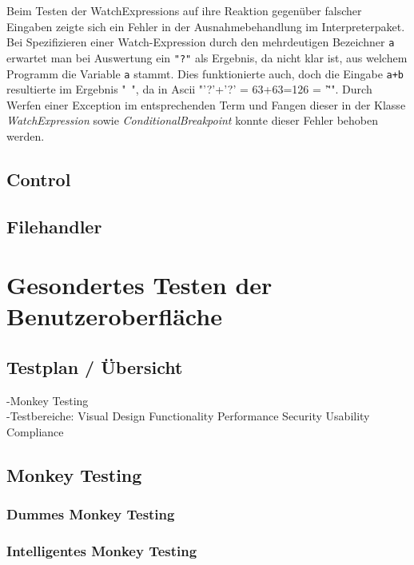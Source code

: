 \documentclass[parskip=full]{scrartcl}
\begin{document}
Beim Testen der WatchExpressions auf ihre Reaktion gegenüber falscher Eingaben zeigte sich ein Fehler in der Ausnahmebehandlung im Interpreterpaket. Bei Spezifizieren einer Watch-Expression durch den mehrdeutigen Bezeichner \texttt{a} erwartet man bei Auswertung ein \texttt{"?"} als Ergebnis, da nicht klar ist, aus welchem Programm die Variable \texttt{a} stammt. Dies funktionierte auch, doch die Eingabe \texttt{a+b} resultierte im Ergebnis "~", da in Ascii "'?'+'?' = 63+63=126 = '\~'".
Durch Werfen einer Exception im entsprechenden Term und Fangen dieser in der Klasse \textit{WatchExpression} sowie \textit{ConditionalBreakpoint} konnte dieser Fehler behoben werden.

\subsection{Control}
\subsection{Filehandler}

\section{Gesondertes Testen der Benutzeroberfläche}

\subsection{Testplan / Übersicht}
-Monkey Testing \\
-Testbereiche: Visual Design Functionality Performance Security Usability Compliance

\subsection{Monkey Testing}
\subsubsection{Dummes Monkey Testing}
\subsubsection{Intelligentes Monkey Testing}
\end{document}
